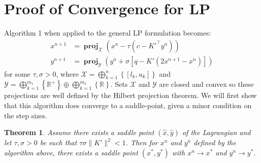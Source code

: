 \documentclass[twoside,12pt,openright]{report}  %
\newtheorem{theorem}{Theorem}[chapter]
\DeclareMathOperator*{\proj}{\textbf{proj}}
\begin{document}
\section{Proof of Convergence for LP}
Algorithm 1 when applied to the general LP formulation becomes:
\begin{align*}
    x^{n+1} &= \proj_{\mathcal{X}}(x^n-\tau(c- K'^\top y^n))\\
    y^{n+1} &= \proj_{\mathcal{Y} }(y^n+\sigma[q -  K' (2x^{n+1}-x^n)])
\end{align*}
for some $\tau,\sigma >0$, where $\mathcal{X} = \displaystyle\bigoplus_{k=1}^{n}\left\{[l_k,u_k]\right\}$ and $\mathcal{Y} = \displaystyle\bigoplus_{k=1}^{m_1}\left\{\mathbb{R}^+ \right\} \oplus \displaystyle\bigoplus_{k=1}^{m_2}\left\{\mathbb{R} \right\}$. Sets $\mathcal{X}$ and $\mathcal{Y}$ are closed and convex so these projections are well defined by the Hilbert projection theorem. We will first show that this algorithm does converge to a saddle-point, given a minor condition on the step sizes.
\begin{theorem}
    Assume there exists a saddle point $(\hat{x},\hat{y})$ of the Lagrangian and let $\tau,\sigma >0$ be such that $\tau\sigma\|K'\|^2<1$. Then for $x^n$ and $y^n$ defined by the algorithm above, there exists a saddle point $(x^*,y^*)$ with $x^n \to x^*$ and $y^n \to y^*$.
\end{theorem}
\end{document}
